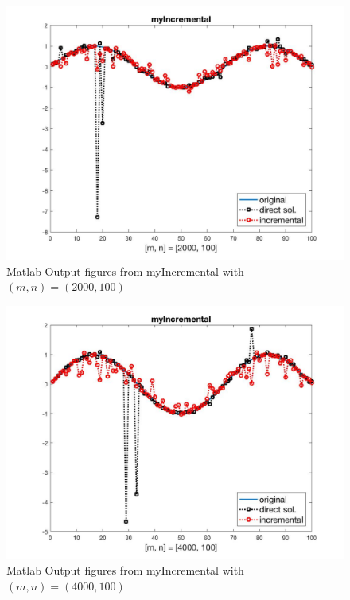\begin{figure}[H]
\centering
\includegraphics[width=12cm]{f_3}
\caption{Matlab Output figures from myIncremental with$(m,n)=(2000,100)$}
\end{figure}
\begin{figure}[H]
\centering
\includegraphics[width=12cm]{f_4}
\caption{Matlab Output figures from myIncremental with$(m,n)=(4000,100)$}
\end{figure}
\clearpage
